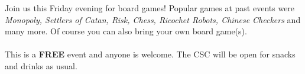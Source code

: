 \documentclass{article}
\begin{document}


Join us this Friday evening for board games! Popular games at past events were \emph{Monopoly, Settlers of Catan, Risk, Chess, Ricochet Robots, Chinese Checkers} and many more. Of course you can also bring your own board game(s).\\
\\
This is a \textbf{FREE} event and anyone is welcome. The CSC will be open for snacks and drinks as usual.

\end{document}
